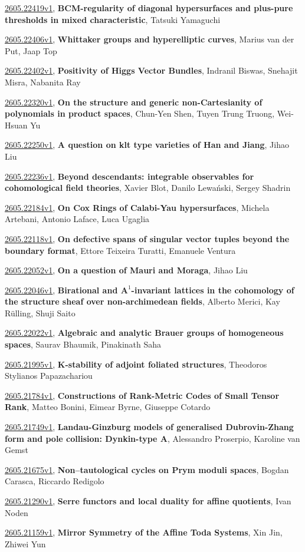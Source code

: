 \documentclass[9pt, a4paper]{article}
\theoremstyle{plain}
\theoremstyle{definition}
\theoremstyle{remark}
\newcommand{\arxiv}[3]{\href{https://arxiv.org/abs/#1}{#1}, \textbf{\textcolor{arxivblue}{#2}}, #3}
\begin{document}
\arxiv{2605.22419v1}{BCM-regularity of diagonal hypersurfaces and plus-pure thresholds in mixed characteristic}{Tatsuki Yamaguchi}

\arxiv{2605.22406v1}{Whittaker groups and hyperelliptic curves}{Marius van der Put, Jaap Top}

\arxiv{2605.22402v1}{Positivity of Higgs Vector Bundles}{Indranil Biswas, Snehajit Misra, Nabanita Ray}

\arxiv{2605.22320v1}{On the structure and generic non-Cartesianity of polynomials in product spaces}{Chun-Yen Shen, Tuyen Trung Truong, Wei-Hsuan Yu}

\arxiv{2605.22250v1}{A question on klt type varieties of Han and Jiang}{Jihao Liu}

\arxiv{2605.22236v1}{Beyond descendants: integrable observables for cohomological field theories}{Xavier Blot, Danilo Lewański, Sergey Shadrin}

\arxiv{2605.22184v1}{On Cox Rings of Calabi-Yau hypersurfaces}{Michela Artebani, Antonio Laface, Luca Ugaglia}

\arxiv{2605.22118v1}{On defective spans of singular vector tuples beyond the boundary format}{Ettore Teixeira Turatti, Emanuele Ventura}

\arxiv{2605.22052v1}{On a question of Mauri and Moraga}{Jihao Liu}

\arxiv{2605.22046v1}{Birational and $\mathbf{A}^1$-invariant lattices in the cohomology of the structure sheaf over non-archimedean fields}{Alberto Merici, Kay Rülling, Shuji Saito}

\arxiv{2605.22022v1}{Algebraic and analytic Brauer groups of homogeneous spaces}{Saurav Bhaumik, Pinakinath Saha}

\arxiv{2605.21995v1}{K-stability of adjoint foliated structures}{Theodoros Stylianos Papazachariou}

\arxiv{2605.21784v1}{Constructions of Rank-Metric Codes of Small Tensor Rank}{Matteo Bonini, Eimear Byrne, Giuseppe Cotardo}

\arxiv{2605.21749v1}{Landau-Ginzburg models of generalised Dubrovin-Zhang form and pole collision: Dynkin-type A}{Alessandro Proserpio, Karoline van Gemst}

\arxiv{2605.21675v1}{Non--tautological cycles on Prym moduli spaces}{Bogdan Carasca, Riccardo Redigolo}

\arxiv{2605.21290v1}{Serre functors and local duality for affine quotients}{Ivan Noden}

\arxiv{2605.21159v1}{Mirror Symmetry of the Affine Toda Systems}{Xin Jin, Zhiwei Yun}
\end{document}

